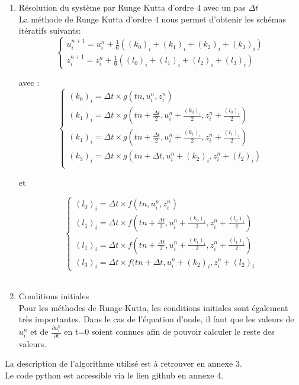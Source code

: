 \begin{enumerate}
    \item Résolution du système par Runge Kutta d'ordre 4 avec un pas $\Delta t$\\
    
    La méthode de Runge Kutta d'ordre 4 nous permet d'obtenir les schémas itératifs suivants:
     \[
      \begin{cases}
        u^{n+1}_{i}= u^n_{i} + \frac{1}{6}((k_0)_{i} +(k_1)_{i} + (k_2)_{i} +(k_3)_{i}) \\
        z^{n+1}_{i}= z^n_{i} + \frac{1}{6}((l_0)_{i} +(l_1)_{i} + (l_2)_{i} +(l_3)_{i})
      \end{cases}
    \]
    
    avec :
    \[
      \begin{cases}
        (k_0)_{i}=\Delta t \times g(tn,u^n_{i},z^n_{i})\\
        (k_1)_{i}=\Delta t \times g(tn + \frac{\Delta t}{2},u^n_{i} +\frac{(k_0)_{i}}{2},z^n_{i} +\frac{(l_0)_{i}}{2})\\
        (k_1)_{i}=\Delta t \times g(tn + \frac{\Delta t}{2},u^n_{i} +\frac{(k_1)_{i}}{2},z^n_{i} +\frac{(l_1)_{i}}{2})\\
        (k_3)_{i}=\Delta t \times g(tn + \Delta t,u^n_{i} +(k_2)_{i},z^n_{i} +(l_2)_{i})\\
      \end{cases}
    \]
    
    et 
    
     \[
      \begin{cases}
        (l_0)_{i}=\Delta t \times f(tn,u^n_{i},z^n_{i})\\
        (l_1)_{i}=\Delta t \times f(tn + \frac{\Delta t}{2},u^n_{i} +\frac{(k_0)_{i}}{2},z^n_{i} +\frac{(l_0)_{i}}{2})\\
        (l_1)_{i}=\Delta t \times f(tn + \frac{\Delta t}{2},u^n_{i} +\frac{(k_1)_{i}}{2},z^n_{i} +\frac{(l_1)_{i}}{2})\\
        (l_3)_{i}=\Delta t \times f(tn + \Delta t,u^n_{i} +(k_2)_{i},z^n_{i} +(l_2)_{i}
      \end{cases}
    \]\\
    
    \item Conditions initiales\\
    
Pour les méthodes de Runge-Kutta, les conditions initiales sont également très importantes.
Dans le cas de l'équation d'onde, il faut que les valeurs de $u^n_{i}$ et de $\frac{\partial u^n_{i}}{\partial t}$ en t=0 soient connues afin de pouvoir calculer le reste des valeurs.\\
    
\end{enumerate}

La description de l'algorithme utilisé est à retrouver en annexe 3.\\
Le code python est accessible via le lien github en annexe 4.
